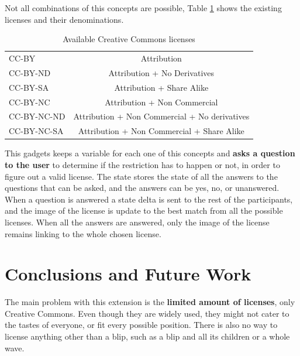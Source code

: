 Not all combinations of this concepts are possible, Table \ref{fig:cc_licenses} shows the existing licenses and their denominations.
\begin{table}[H]
  \begin{center}
    \begin{tabular}{ | l | c |}
      \hline
      CC-BY & Attribution\\
      CC-BY-ND & Attribution + No Derivatives\\      
      CC-BY-SA & Attribution + Share Alike\\
      CC-BY-NC & Attribution + Non Commercial\\
      CC-BY-NC-ND & Attribution + Non Commercial + No derivatives\\
      CC-BY-NC-SA & Attribution + Non Commercial + Share Alike\\
      \hline
    \end{tabular}
  \end{center}
  \caption{Available Creative Commons licenses}
  \label{fig:cc_licenses}
\end{table}
This gadgets keeps a variable for each one of this concepts and \textbf{asks a question to the user} to determine if the restriction has to happen or not, in order to figure out a valid license. The state stores the state of all the answers to the questions that can be asked, and the answers can be yes, no, or unanswered. When a question is answered a state delta is sent to the rest of the participants, and the image of the license is update to the best match from all the possible licenses. When all the answers are answered, only the image of the license remains linking to the whole chosen license.\\[.2cm]
\section{Conclusions and Future Work}
The main problem with this extension is the \textbf{limited amount of licenses}, only Creative Commons. Even though they are widely used, they might not cater to the tastes of everyone, or fit every possible position. There is also no way to license anything other than a blip, such as a blip and all its children or a whole wave.
\newpage

